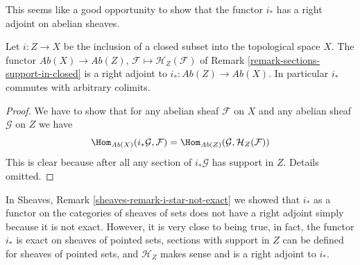 \noindent
This seems like a good opportunity to show that the functor
$i_*$ has a right adjoint on abelian sheaves.

\begin{lemma}
\label{lemma-i-star-right-adjoint}
Let $i : Z \to X$ be the inclusion of a closed subset into the
topological space $X$. The functor $\textit{Ab}(X) \to \textit{Ab}(Z)$,
$\mathcal{F} \mapsto \mathcal{H}_Z(\mathcal{F})$ of
Remark \ref{remark-sections-support-in-closed}
is a right adjoint to $i_* : \textit{Ab}(Z) \to \textit{Ab}(X)$.
In particular $i_*$ commutes with arbitrary colimits.
\end{lemma}

\begin{proof}
We have to show that for any abelian sheaf $\mathcal{F}$ on $X$ and any
abelian sheaf $\mathcal{G}$ on $Z$ we have
$$
\Hom_{\textit{Ab}(X)}(i_*\mathcal{G}, \mathcal{F}) =
\Hom_{\textit{Ab}(Z)}(\mathcal{G}, \mathcal{H}_Z(\mathcal{F}))
$$
This is clear because after all any section of $i_*\mathcal{G}$
has support in $Z$. Details omitted.
\end{proof}

\begin{remark}
\label{remark-i-star-right-adjoint}
In Sheaves, Remark \ref{sheaves-remark-i-star-not-exact}
we showed that $i_*$ as a functor
on the categories of sheaves of sets
does not have a right adjoint simply because
it is not exact. However, it is very close to being
true, in fact, the functor $i_*$ is exact on sheaves
of pointed sets, sections with support in $Z$ can
be defined for sheaves of pointed sets, and $\mathcal{H}_Z$
makes sense and is a right adjoint to $i_*$.
\end{remark}









